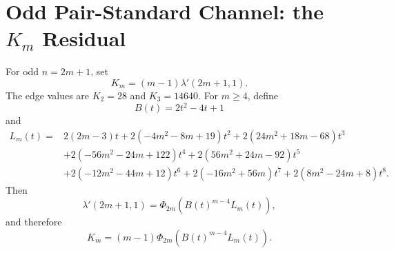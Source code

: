 \section[Odd Pair-Standard Channel: the Km Residual]{Odd Pair-Standard Channel: the $K_m$ Residual}\label{sec:km}

\begin{lemma}[$K_m$ is the odd pair-standard, $k=1$, residual]\label{lem:K}
For odd $n=2m+1$, set
\[
  K_m=(m-1)\lambda'(2m+1,1).
\]
The edge values are $K_2=28$ and $K_3=14640$.  For $m\ge4$, define
\[
  B(t)=2t^2-4t+1
\]
and
\begin{align*}
L_m(t)={}&2(2m-3)t+2(-4m^2-8m+19)t^2+2(24m^2+18m-68)t^3 \\
&+2(-56m^2-24m+122)t^4+2(56m^2+24m-92)t^5 \\
&+2(-12m^2-44m+12)t^6+2(-16m^2+56m)t^7+2(8m^2-24m+8)t^8.
\end{align*}
Then
\[
  \lambda'(2m+1,1)=\Phi_{2m}\left(B(t)^{m-4}L_m(t)\right),
\]
and therefore
\[
  K_m=(m-1)\Phi_{2m}\left(B(t)^{m-4}L_m(t)\right).
\]
\end{lemma}

